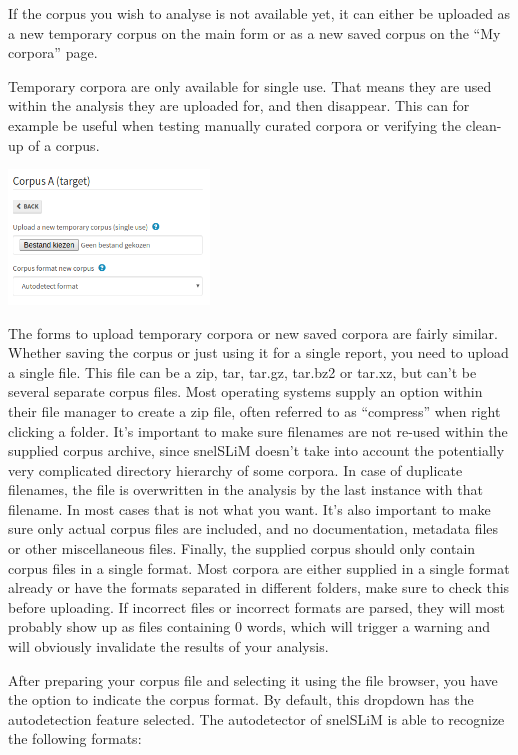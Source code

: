 \documentclass[11pt,a4paper]{article}
\begin{document}
If the corpus you wish to analyse is not available yet, it can either be uploaded as a new temporary corpus on the main form or as a new saved corpus on the ``My corpora'' page. 

Temporary corpora are only available for single use. That means they are used within the analysis they are uploaded for, and then disappear. This can for example be useful when testing manually curated corpora or verifying the clean-up of a corpus.

\centerline{\includegraphics[width=0.4\textwidth]{images/corpusupload.png}}

The forms to upload temporary corpora or new saved corpora are fairly similar. Whether saving the corpus or just using it for a single report, you need to upload a single file. This file can be a zip, tar, tar.gz, tar.bz2 or tar.xz, but can't be several separate corpus files. Most operating systems supply an option within their file manager to create a zip file, often referred to as ``compress'' when right clicking a folder. It's important to make sure filenames are not re-used within the supplied corpus archive, since snelSLiM doesn't take into account the potentially very complicated directory hierarchy of some corpora. In case of duplicate filenames, the file is overwritten in the analysis by the last instance with that filename. In most cases that is not what you want. It's also important to make sure only actual corpus files are included, and no documentation, metadata files or other miscellaneous files. Finally, the supplied corpus should only contain corpus files in a single format. Most corpora are either supplied in a single format already or have the formats separated in different folders, make sure to check this before uploading. If incorrect files or incorrect formats are parsed, they will most probably show up as files containing 0 words, which will trigger a warning and will obviously invalidate the results of your analysis.

After preparing your corpus file and selecting it using the file browser, you have the option to indicate the corpus format. By default, this dropdown has the autodetection feature selected. The autodetector of snelSLiM is able to recognize the following formats:
\end{document}
